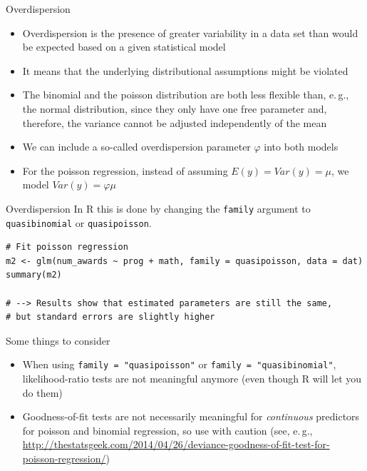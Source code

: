 \documentclass[aspectratio=169]{beamer}
\begin{document}
\begin{frame}{Overdispersion}
  \begin{itemize}
    \item Overdispersion is the presence of greater variability in a data
      set than would be expected based on a given statistical model
    \item It means that the underlying distributional assumptions might be
      violated
    \item The binomial and the poisson distribution are both less flexible
      than, e.\,g., the normal distribution, since they only have one free
      parameter and, therefore, the variance cannot be adjusted
      independently of the mean
    \item We can include a so-called overdispersion parameter $\varphi$
      into both models
    \item For the poisson regression, instead of assuming $E(y) = Var(y) =
      \mu$, we model $Var(y) = \varphi\mu$
  \end{itemize}
\end{frame}

\begin{frame}[fragile]{Overdispersion}
In R this is done by changing the \texttt{family} argument to
  \texttt{quasibinomial} or \texttt{quasipoisson}.
  \vfill
\begin{lstlisting}
# Fit poisson regression
m2 <- glm(num_awards ~ prog + math, family = quasipoisson, data = dat)
summary(m2)

# --> Results show that estimated parameters are still the same,
# but standard errors are slightly higher
\end{lstlisting}
\end{frame}

\begin{frame}{Some things to consider}
  \begin{itemize}
    \item When using \texttt{family = "quasipoisson"} or \texttt{family =
      "quasibinomial"}, likelihood-ratio tests are not meaningful anymore
      (even though R will let you do them)
    \item Goodness-of-fit tests are not necessarily meaningful for
      \emph{continuous} predictors for poisson and binomial regression, so
      use with caution
      (see, e.\,g.,
      \url{http://thestatsgeek.com/2014/04/26/deviance-goodness-of-fit-test-for-poisson-regression/})
  \end{itemize}
\end{frame}
\end{document}
